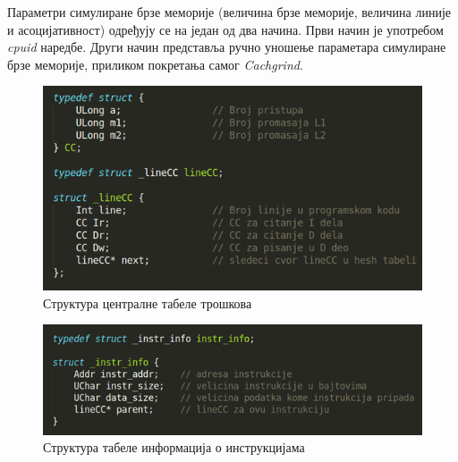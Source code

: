 \documentclass[12pt,oneside]{memoir}
\begin{document}
\indent Параметри симулиране брзе меморије (величина брзе меморије, величина линије и асоцијативност) одређују се на један од два начина. Први начин је употребом \textit{cpuid} наредбе. Други начин представља ручно уношење параметара симулиране брзе меморије, приликом покретања самог \textit{Cachgrind}.

\begin{figure}[h!]
\begin{center}
\includegraphics[scale=0.75]{slika11.png}
\end{center}
\caption{Структура централне табеле трошкова}
\label{fig:tabelaTroskova}
\end{figure}

\begin{figure}[h!]
\begin{center}
\includegraphics[scale=0.75]{slika12.png}
\end{center}
\caption{Структура табеле информација о инструкцијама}
\label{fig:infoInstr}
\end{figure}
\end{document}
